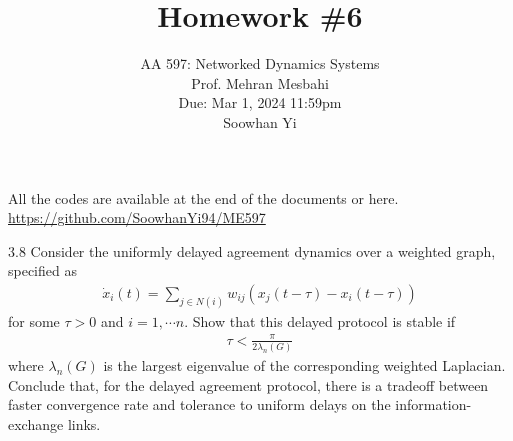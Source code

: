 \documentclass{article}
\begin{document}
\setcounter{problem}{0}
\title{Homework \#6}
\author{
    \normalsize{AA 597: Networked Dynamics Systems}\\
    \normalsize{Prof. Mehran Mesbahi}\\
    \normalsize{Due: Mar 1, 2024 11:59pm}\\
    \normalsize{Soowhan Yi}
}
\date{{}}
\maketitle

All the codes are available at the end of the documents or here.
\url{https://github.com/SoowhanYi94/ME597}
\begin{problem}3.8
    Consider the uniformly delayed agreement dynamics over a weighted graph, speciﬁed as
    \begin{align*}
        \dot x_i(t) = \sum_{j \in N(i)} w_{ij} (x_j(t - \tau) - x_i (t-\tau))
    \end{align*}
    for some $\tau > 0$ and $i = 1, \cdots n$. Show that this delayed protocol is stable if 
    \begin{align*}
        \tau < \frac{\pi}{2\lambda_n(G)}
    \end{align*}
    where $\lambda_n(G)$ is the largest eigenvalue of the corresponding weighted Laplacian. Conclude that, for the delayed agreement protocol, there is a tradeoff between faster convergence rate and tolerance to uniform delays on the information-exchange links.


\end{problem}
\end{document}
